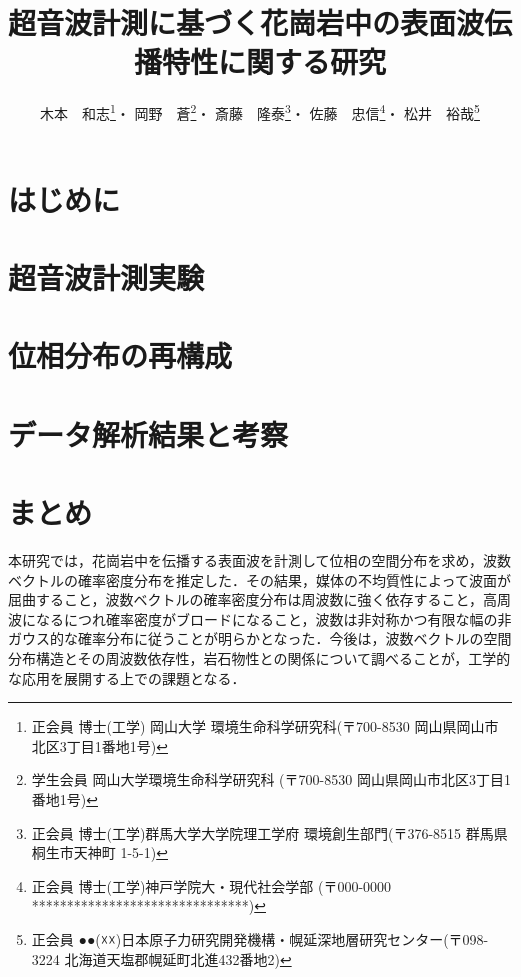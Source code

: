 \documentclass{jsce}
\title{
	超音波計測に基づく花崗岩中の表面波伝播特性に関する研究
}%
\author{木本　和志\thanks{正会員 博士(工学) 岡山大学 環境生命科学研究科(〒700-8530 岡山県岡山市北区3丁目1番地1号)\email{kimoto@cc.okayama-u.ac.jp}}・
岡野　蒼\thanks{学生会員 岡山大学環境生命科学研究科 (〒700-8530 岡山県岡山市北区3丁目1番地1号)}・
斎藤　隆泰\thanks{正会員 博士(工学)群馬大学大学院理工学府 環境創生部門(〒376-8515 群馬県桐生市天神町 1-5-1)}・
佐藤　忠信\thanks{正会員 博士(工学)神戸学院大・現代社会学部 (〒000-0000 *******************************)}・
松井　裕哉\thanks{正会員 ●●(☓☓)日本原子力研究開発機構・幌延深地層研究センター(〒098-3224 北海道天塩郡幌延町北進432番地2)}
}
\begin{document}
\maketitle
\section{はじめに}
	
	\vspace{-2mm}
\section{超音波計測実験}
	
\section{位相分布の再構成}
	
\section{データ解析結果と考察}
	
\section{まとめ}
本研究では，花崗岩中を伝播する表面波を計測して位相の空間分布を求め，波数ベクトルの確率密度分布を推定した．その結果，媒体の不均質性によって波面が屈曲すること，波数ベクトルの確率密度分布は周波数に強く依存すること，高周波になるにつれ確率密度がブロードになること，波数は非対称かつ有限な幅の非ガウス的な確率分布に従うことが明らかとなった．今後は，波数ベクトルの空間分布構造とその周波数依存性，岩石物性との関係について調べることが，工学的な応用を展開する上での課題となる．
\end{document}
